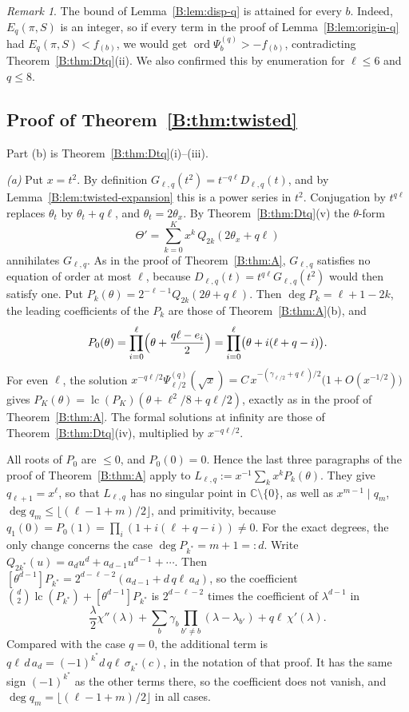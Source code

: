\documentclass[11pt,a4paper]{article}
\theoremstyle{definition}
\theoremstyle{remark}
\newtheorem{remark}[theorem]{Remark}
\newcommand{\C}{\mathbb C}
\newcommand{\fl}[1]{\lfloor #1\rfloor}
\DeclareMathOperator{\ord}{ord}
\DeclareMathOperator{\lc}{lc}
\numberwithin{equation}{section}
\begin{document}
\begin{remark}
The bound of Lemma~\ref{B:lem:disp-q} is attained for every $b$. Indeed, $E_q(\pi,S)$ is an integer, so if every term in the proof of Lemma~\ref{B:lem:origin-q} had $E_q(\pi,S)<f_{(b)}$, we would get $\ord\Psi^{(q)}_b>-f_{(b)}$, contradicting Theorem~\ref{B:thm:Dtq}(ii). We also confirmed this by enumeration for $\ell\le6$ and $q\le8$.
\end{remark}

\subsection{Proof of Theorem~\ref{B:thm:twisted}}
Part (b) is Theorem~\ref{B:thm:Dtq}(i)--(iii).

\emph{(a)} Put $x=t^2$. By definition $G_{\ell,q}(t^2)=t^{-q\ell}D_{\ell,q}(t)$, and by Lemma~\ref{B:lem:twisted-expansion} this is a power series in $t^2$. Conjugation by $t^{q\ell}$ replaces $\theta_t$ by $\theta_t+q\ell$, and $\theta_t=2\theta_x$. By Theorem~\ref{B:thm:Dtq}(v) the $\theta$-form
\[
\Theta'=\sum_{k=0}^{K}x^k\,Q_{2k}(2\theta_x+q\ell)
\]
annihilates $G_{\ell,q}$. As in the proof of Theorem~\ref{B:thm:A}, $G_{\ell,q}$ satisfies no equation of order at most $\ell$, because $D_{\ell,q}(t)=t^{q\ell}G_{\ell,q}(t^2)$ would then satisfy one. Put $P_k(\theta)=2^{-\ell-1}Q_{2k}(2\theta+q\ell)$. Then $\deg P_k=\ell+1-2k$, the leading coefficients of the $P_k$ are those of Theorem~\ref{B:thm:A}(b), and
\[
P_0(\theta)=\prod_{i=0}^{\ell}\Bigl(\theta+\frac{q\ell-e_i}2\Bigr)=\prod_{i=0}^{\ell}\bigl(\theta+i(\ell+q-i)\bigr).
\]
For even $\ell$, the solution $x^{-q\ell/2}\Psi^{(q)}_{\ell/2}(\sqrt x)=C\,x^{-(\gamma_{\ell/2}+q\ell)/2}\bigl(1+O(x^{-1/2})\bigr)$ gives $P_K(\theta)=\lc(P_K)(\theta+\ell^2/8+q\ell/2)$, exactly as in the proof of Theorem~\ref{B:thm:A}. The formal solutions at infinity are those of Theorem~\ref{B:thm:Dtq}(iv), multiplied by $x^{-q\ell/2}$.

All roots of $P_0$ are $\le0$, and $P_0(0)=0$. Hence the last three paragraphs of the proof of Theorem~\ref{B:thm:A} apply to $L_{\ell,q}:=x^{-1}\sum_kx^kP_k(\theta)$. They give $q_{\ell+1}=x^\ell$, so that $L_{\ell,q}$ has no singular point in $\C\setminus\{0\}$, as well as $x^{m-1}\mid q_m$, $\deg q_m\le\fl{(\ell-1+m)/2}$, and primitivity, because $q_1(0)=P_0(1)=\prod_i(1+i(\ell+q-i))\ne0$. For the exact degrees, the only change concerns the case $\deg P_{k^*}=m+1=:d$. Write $Q_{2k^*}(u)=a_du^d+a_{d-1}u^{d-1}+\cdots$. Then $[\theta^{d-1}]P_{k^*}=2^{d-\ell-2}(a_{d-1}+d\,q\ell\,a_d)$, so the coefficient $\binom{d}2\lc(P_{k^*})+[\theta^{d-1}]P_{k^*}$ is $2^{d-\ell-2}$ times the coefficient of $\lambda^{d-1}$ in
\[
\frac\lambda2\chi''(\lambda)+\sum_b\gamma_b\prod_{b'\ne b}(\lambda-\lambda_{b'})+q\ell\,\chi'(\lambda).
\]
Compared with the case $q=0$, the additional term is $q\ell\,d\,a_d=(-1)^{k^*}d\,q\ell\,\sigma_{k^*}(c)$, in the notation of that proof. It has the same sign $(-1)^{k^*}$ as the other terms there, so the coefficient does not vanish, and $\deg q_m=\fl{(\ell-1+m)/2}$ in all cases.
\end{document}
